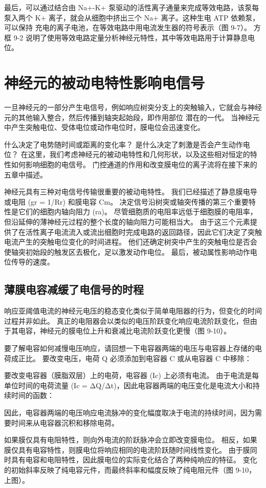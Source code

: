 最后，可以通过结合由 Na+-K+ 泵驱动的活性离子通量来完成等效电路，该泵每泵入两个 K+ 离子，就会从细胞中挤出三个 Na+ 离子。这种生电 ATP 依赖泵，可以保持 充电的离子电池，在等效电路中用电流发生器的符号表示（图 9-7）。 方框 9-2 说明了使用等效电路定量分析神经元特性，其中等效电路用于计算静息电位。


\section{神经元的被动电特性影响电信号}
一旦神经元的一部分产生电信号，例如响应树突分支上的突触输入，它就会与神经元的其他输入整合，然后传播到轴突起始段，即作用部位 潜在的一代。 当神经元中产生突触电位、受体电位或动作电位时，膜电位会迅速变化。

什么决定了电势随时间或距离的变化率？ 是什么决定了刺激是否会产生动作电位？ 在这里，我们考虑神经元的被动电特性和几何形状，以及这些相对恒定的特性如何影响细胞的电信号。 门控通道的作用和改变膜电位的离子流将在接下来的五章中描述。

神经元具有三种对电信号传输很重要的被动电特性。 我们已经描述了静息膜电导或电阻 (gr = 1/Rr) 和膜电容 Cm。 决定信号沿树突或轴突传播的第三个重要特性是它们的细胞内轴向阻力 (ra)。 尽管细胞质的电阻率远低于细胞膜的电阻率，但沿延伸的薄神经元过程的整个长度的轴向阻力可能相当大。 由于这三个元素提供了在活性离子电流流入或流出细胞时完成电路的返回路径，因此它们决定了突触电流产生的突触电位变化的时间进程。 他们还确定树突中产生的突触电位是否会使轴突初始段的触发区去极化，足以激发动作电位。 最后，被动属性影响动作电位传导的速度。

\subsection{薄膜电容减缓了电信号的时程}
响应亚阈值电流的神经元电压的稳态变化类似于简单电阻器的行为，但变化的时间过程并非如此。 真正的电阻器会以类似的电压阶跃变化响应电流阶跃变化，但由于其电容，神经元的膜电位上升和衰减比电流阶跃变化更慢（图 9-10）。

要了解电容如何减慢电压响应，请回想一下电容器两端的电压与电容器上存储的电荷成正比。 要改变电压，电荷 Q 必须添加到电容器 C 或从电容器 C 中移除：

要改变电容器（膜脂双层）上的电荷，电容器 (Ic) 上必须有电流。 由于电流是每单位时间的电荷流量 (Ic = ΔQ/Δt)，因此电容器两端的电压变化是电流大小和持续时间的函数：

因此，电容器两端的电压响应电流脉冲的变化幅度取决于电流的持续时间，因为需要时间来从电容器沉积和移除电荷。

如果膜仅具有电阻特性，则向外电流的阶跃脉冲会立即改变膜电位。 相反，如果膜仅具有电容特性，则膜电位将响应相同的电流阶跃随时间线性变化。 由于膜同时具有电容和电阻特性，因此膜电位的实际变化结合了两种纯响应的特征。 变化的初始斜率反映了纯电容元件，而最终斜率和幅度反映了纯电阻元件（图 9-10，上图）。


